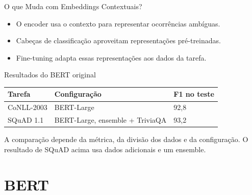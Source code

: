 \documentclass[aspectratio=169, xcolor=dvipsnames]{beamer}
\begin{document}
  \begin{frame}{O que Muda com Embeddings Contextuais?}
    \begin{itemize}
      \item O encoder usa o contexto para representar ocorrências ambíguas.
      \item Cabeças de classificação aproveitam representações pré-treinadas.
      \item Fine-tuning adapta essas representações aos dados da tarefa.
    \end{itemize}
    \begin{block}{Resultados do BERT original\cite{devlin2019bert}}
      \begin{tabular}{lll}
        \toprule
        Tarefa & Configuração & F1 no teste\\
        \midrule
        CoNLL-2003 & BERT-Large & 92,8\\
        SQuAD 1.1 & BERT-Large, ensemble + TriviaQA & 93,2\\
        \bottomrule
      \end{tabular}
    \end{block}
    A comparação depende da métrica, da divisão dos dados e da configuração.
    O resultado de SQuAD acima usa dados adicionais e um ensemble.
  \end{frame}

  \section{BERT}
\end{document}
